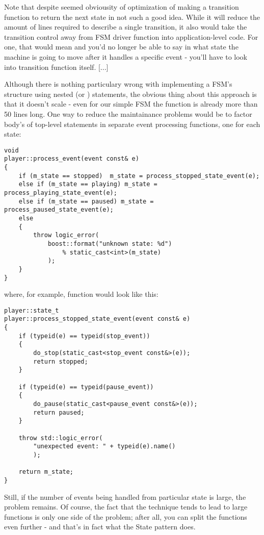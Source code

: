 \documentclass{netobjectdays}
\begin{document}
Note that despite seemed obviousity of optimization of making 
a transition function to return the next state in not such a 
good idea. While it will reduce the amount of lines required 
to describe a single transition, it also would take the 
transition control away from FSM driver function into 
application-level code. For one, that would mean and you'd no 
longer be able to say in what state the machine is going to 
move after it handles a specific event - you'll have to look 
into transition function itself. [...] 

Although there is nothing particulary wrong with implementing 
a FSM's structure using nested  (or )
statements, the obvious thing about this approach is that it 
doesn't scale - even for our simple FSM the 
 function is already more than 50 lines
long. One way to reduce the maintainance problems would be to 
factor body's of top-level  statements in separate 
event processing functions, one for each state:

{\footnotesize
\begin{verbatim}
void
player::process_event(event const& e)
{
    if (m_state == stopped)  m_state = process_stopped_state_event(e);
    else if (m_state == playing) m_state = process_playing_state_event(e);
    else if (m_state == paused) m_state = process_paused_state_event(e);
    else
    {
        throw logic_error(
            boost::format("unknown state: %d")
                % static_cast<int>(m_state)
            );
    }
}
\end{verbatim}
}

where, for example,  
function would look like this:

{\footnotesize
\begin{verbatim}
player::state_t
player::process_stopped_state_event(event const& e)
{
    if (typeid(e) == typeid(stop_event))
    {
        do_stop(static_cast<stop_event const&>(e));
        return stopped;
    }

    if (typeid(e) == typeid(pause_event))
    {
        do_pause(static_cast<pause_event const&>(e));
        return paused;
    }

    throw std::logic_error(
        "unexpected event: " + typeid(e).name()
        );

    return m_state;
}
\end{verbatim}
}

Still, if the number of events being handled from particular 
state is large, the problem remains. Of course, the fact that 
the technique tends to lead to large functions is only one 
side of the problem; after all, you can split the functions 
even further - and that's in fact what the State pattern does.
\end{document}
